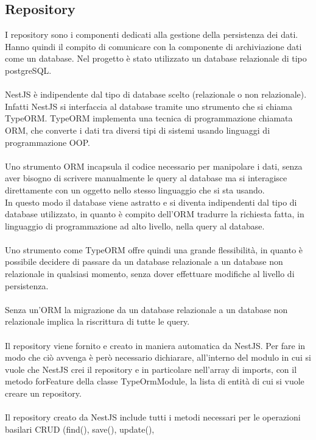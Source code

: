 \subsection{Repository}
I repository sono i componenti dedicati alla gestione della persistenza dei dati. Hanno quindi il compito di
comunicare con la componente di archiviazione dati come un database. Nel progetto è stato utilizzato un database
relazionale di tipo postgreSQL.
\\\\
NestJS è indipendente dal tipo di database scelto (relazionale o non relazionale). Infatti NestJS si interfaccia
al database tramite uno strumento che si chiama TypeORM. TypeORM implementa una tecnica di programmazione chiamata 
ORM, che converte i dati tra diversi tipi di sistemi usando linguaggi di programmazione OOP.
\\\\
Uno strumento ORM incapsula il codice necessario per manipolare i dati, senza aver bisogno di scrivere manualmente
le query al database ma si interagisce direttamente con un oggetto nello stesso linguaggio che si sta usando. 
\\
In questo modo il database viene astratto e si diventa indipendenti dal tipo di database utilizzato, in quanto è compito dell'ORM
tradurre la richiesta fatta, in linguaggio di programmazione ad alto livello, nella query al database. 
\\\\
Uno strumento come TypeORM offre quindi una grande flessibilità, in quanto è possibile decidere di passare da un database
relazionale a un database non relazionale in qualsiasi momento, senza dover effettuare modifiche al livello di persistenza.
\\\\
Senza un'ORM la migrazione da un database relazionale a un database non relazionale implica la riscrittura di tutte le query.
\\\\
Il repository viene fornito e creato in maniera automatica da NestJS. Per fare in modo che ciò avvenga è però necessario
dichiarare, all'interno del modulo in cui si vuole che NestJS crei il repository e in particolare nell'array di imports, con 
il metodo forFeature della classe TypeOrmModule, la lista di entità di cui si vuole creare un repository.
\\\\
Il repository creato da NestJS include tutti i metodi necessari per le operazioni basilari CRUD (find(), save(), update(), 
